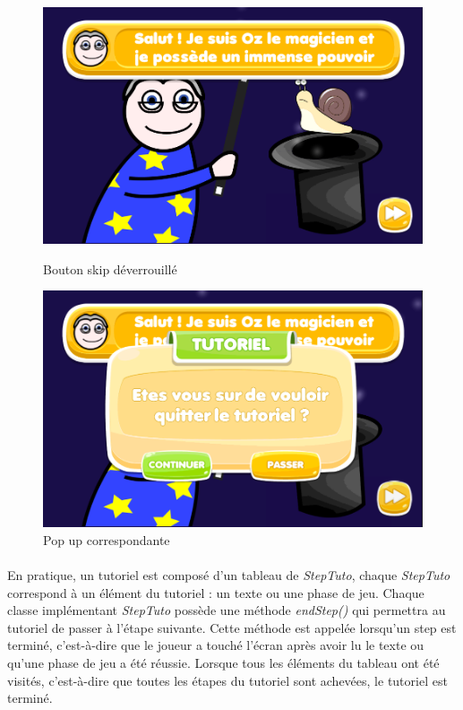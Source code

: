 \begin{figure}[H]
 \begin{minipage}{0.49\textwidth}\centering
     \includegraphics[scale=0.2]{./img/skip_unlocked.png}
     \caption{Bouton skip déverrouillé}
     \label{skip_unlocked}
   \end{minipage}
   \begin {minipage}{0.49\textwidth}\centering
     \includegraphics[scale=0.2]{./img/skip_unlocked_popup.png}
     \caption{Pop up correspondante}
     \label{skip_unlocked_popup}
   \end{minipage}
\end{figure}

\paragraph{}
En pratique, un tutoriel est composé d'un tableau de \textit{StepTuto}, chaque \textit{StepTuto} correspond à un élément du tutoriel : un texte ou une phase de jeu. Chaque classe implémentant \textit{StepTuto} possède une méthode \textit{endStep()} qui permettra au tutoriel de passer à l'étape suivante. Cette méthode est appelée lorsqu'un step est terminé, c'est-à-dire que le joueur a touché l'écran après avoir lu le texte ou qu'une phase de jeu a été réussie. Lorsque tous les éléments du tableau ont été visités, c'est-à-dire que toutes les étapes du tutoriel sont achevées, le tutoriel est terminé.

